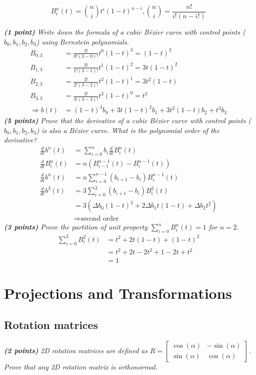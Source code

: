 \documentclass[a4paper,10pt]{article}
\begin{document}
\[B_i^n(t)=\binom{n}{i}t^i(1-t)^{n-i},\binom{n}{i}=\frac{n!}{i!(n-i!)}\]

\textit{\textbf{(1 point)} Write down the formula of a cubic Bézier curve with control points ($b_0,b_1,b_2,b_3$) using Bernstein polynomials.}\\


\[\begin{aligned} 
B_{0,3}&=\frac{3!}{0!(3-0)!}t^0(1-t)^{3}=(1-t)^{3}\\
B_{1,3}&=\frac{3!}{1!(3-1)!}t^1(1-t)^{2}=3t(1-t)^{2}\\
B_{2,3}&=\frac{3!}{2!(3-2)!}t^2(1-t)^{1}=3t^2(1-t)\\
B_{3,3}&=\frac{3!}{3!(3-3)!}t^3(1-t)^{0}=t^{3}\\
\Rightarrow b(t)&=(1-t)^3b_0+3t(1-t)^{2}b_1+3t^2(1-t)b_2+t^3b_3
\end{aligned}\]
\textit{\textbf{(5 points)} Prove that the derivative of a cubic Bézier curve with control points ($b_0,b_1,b_2,b_3$) is also a Bézier curve. What is the polynomial order of the derivative?}
\[\begin{aligned} 
\frac{d}{dt}b^n(t)&=\sum_{i=0}^nb_i\frac{d}{dt}B_i^n(t)\\
\frac{d}{dt}B_i^n(t)&=n(B_{i-1}^{n-1}(t) - B_{i}^{n-1}(t))\\
\frac{d}{dt}b^n(t)&=n\sum_{i=0}^{n-1} (b_{i+1}-b_i)B_i^{n-1}(t)\\
\frac{d}{dt}b^3(t)&=3\sum_{i=0}^{2} (b_{i+1}-b_i)B_i^{2}(t)\\
&=3(\Delta b_0(1-t)^2+ 2\Delta b_1 t (1-t) +\Delta b_2t^2)\\
& \Rightarrow \text{second order}
\end{aligned}\]
\textit{\textbf{(3 points)} Prove the partition of unit property $\sum_{i=0}^nB_i^n(t)=1$ for $n=2$.}
\[\begin{aligned} 
\sum_{i=0}^2B_i^2(t)&=t^2+2t(1-t)+(1-t)^2\\
&=t^2+2t-2t^2+1-2t+t^2\\
&=1
\end{aligned}\]

\section{Projections and Transformations}
\subsection{Rotation matrices}
\textit{\textbf{(2 points)} 2D rotation matrices are defined as $R=\begin{bmatrix}
	\cos(\alpha)&-\sin(\alpha)\\ 
	\sin(\alpha)&\cos(\alpha)
	\end{bmatrix}$. Prove that any 2D rotation matrix is orthonormal.}\\
\end{document}
